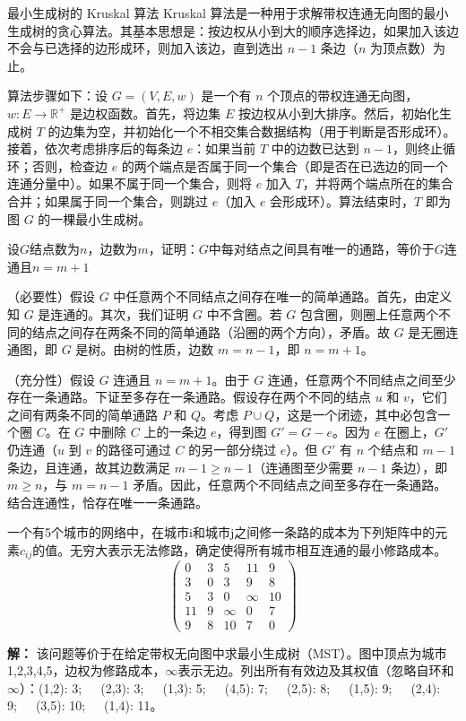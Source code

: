\begin{theorem}{最小生成树的 Kruskal 算法}{}
    Kruskal 算法是一种用于求解带权连通无向图的最小生成树的贪心算法。其基本思想是：按边权从小到大的顺序选择边，如果加入该边不会与已选择的边形成环，则加入该边，直到选出 $n-1$ 条边（$n$ 为顶点数）为止。

    算法步骤如下：设 $G=(V,E,w)$ 是一个有 $n$ 个顶点的带权连通无向图，$w:E\to \mathbb{R}^+$ 是边权函数。首先，将边集 $E$ 按边权从小到大排序。然后，初始化生成树 $T$ 的边集为空，并初始化一个不相交集合数据结构（用于判断是否形成环）。接着，依次考虑排序后的每条边 $e$：如果当前 $T$ 中的边数已达到 $n-1$，则终止循环；否则，检查边 $e$ 的两个端点是否属于同一个集合（即是否在已选边的同一个连通分量中）。如果不属于同一个集合，则将 $e$ 加入 $T$，并将两个端点所在的集合合并；如果属于同一个集合，则跳过 $e$（加入 $e$ 会形成环）。算法结束时，$T$ 即为图 $G$ 的一棵最小生成树。
\end{theorem}
\begin{example}{}{}
    设$G$结点数为$n$，边数为$m$，证明：$G$中每对结点之间具有唯一的通路，等价于$G$连通且$n=m+1$
\end{example}
（必要性）假设 $G$ 中任意两个不同结点之间存在唯一的简单通路。首先，由定义知 $G$ 是连通的。其次，我们证明 $G$ 中不含圈。若 $G$ 包含圈，则圈上任意两个不同的结点之间存在两条不同的简单通路（沿圈的两个方向），矛盾。故 $G$ 是无圈连通图，即 $G$ 是树。由树的性质，边数 $m = n-1$，即 $n = m+1$。

（充分性）假设 $G$ 连通且 $n = m+1$。由于 $G$ 连通，任意两个不同结点之间至少存在一条通路。下证至多存在一条通路。假设存在两个不同的结点 $u$ 和 $v$，它们之间有两条不同的简单通路 $P$ 和 $Q$。考虑 $P \cup Q$，这是一个闭迹，其中必包含一个圈 $C$。在 $G$ 中删除 $C$ 上的一条边 $e$，得到图 $G' = G - e$。因为 $e$ 在圈上，$G'$ 仍连通（$u$ 到 $v$ 的路径可通过 $C$ 的另一部分绕过 $e$）。但 $G'$ 有 $n$ 个结点和 $m-1$ 条边，且连通，故其边数满足 $m-1 \ge n-1$（连通图至少需要 $n-1$ 条边），即 $m \ge n$，与 $m = n-1$ 矛盾。因此，任意两个不同结点之间至多存在一条通路。结合连通性，恰存在唯一一条通路。

\begin{example}{}{}
    一个有5个城市的网络中，在城市i和城市j之间修一条路的成本为下列矩阵中的元素$c_{ij}$的值。无穷大表示无法修路，确定使得所有城市相互连通的最小修路成本。
    \[\begin{pmatrix}
        0&3&5&11&9\\
        3&0&3&9&8\\
        5&3&0&\infty&10\\
        11&9&\infty&0&7\\
        9&8&10&7&0
    \end{pmatrix}\]
\end{example}
\textbf{解：} 该问题等价于在给定带权无向图中求最小生成树（MST）。图中顶点为城市1,2,3,4,5，边权为修路成本，$\infty$表示无边。列出所有有效边及其权值（忽略自环和$\infty$）：(1,2): 3;~~~(2,3): 3;~~~(1,3): 5;~~~(4,5): 7;~~~(2,5): 8;~~~(1,5): 9;~~~(2,4): 9;~~~(3,5): 10;~~~(1,4): 11。

